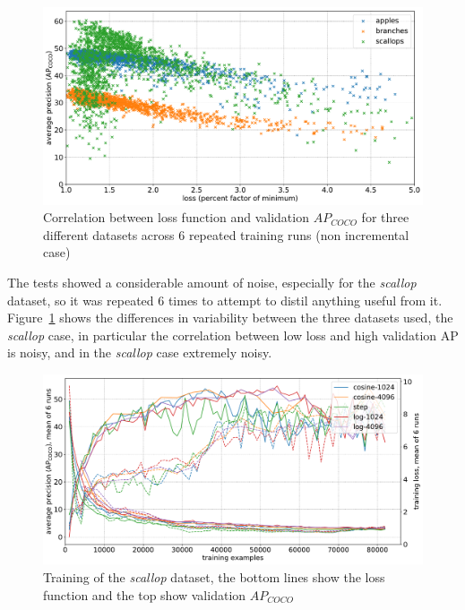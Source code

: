 \begin{figure}[h]
  \centering
  \includegraphics[width=1.0\linewidth]{charts/training/lr_schedule/scatter_loss_ap.pdf}
  \caption{Correlation between loss function and validation $AP_{COCO}$ for three different datasets across 6 repeated training runs (non incremental case)}  \label{fig:scatter_loss_ap}
\end{figure}

The tests showed a considerable amount of noise, especially for the \emph{scallop} dataset, so it was repeated 6 times to attempt to distil anything useful from it. Figure~\ref{fig:scatter_loss_ap} shows the differences in variability between the three datasets used, the \emph{scallop} case, in particular the correlation between low loss and high validation \gls{AP} is noisy, and in the \emph{scallop} case extremely noisy. 

\begin{figure}[h]
  \centering
  \includegraphics[width=1.0\linewidth]{charts/training/lr_schedule/scallops.pdf}
  \caption{Training of the \emph{scallop} dataset, the bottom lines show the loss function and the top show validation $AP_{COCO}$}  
  \label{fig:scallop_lr}
\end{figure}


